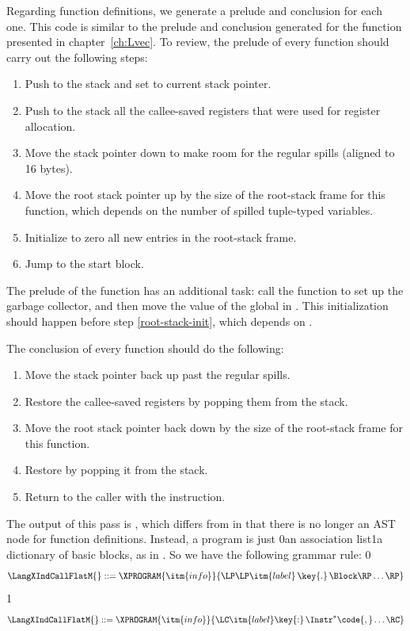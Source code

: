 \documentclass[7x10]{TimesAPriori_MIT}%
\def\racketEd{0}
\def\pythonEd{1}
\providecommand{\BookEdition}{1}
\let\edition\BookEdition
\newcommand{\racket}[1]{{\if\edition\racketEd{#1}\fi}}
\newcommand{\pythonColor}[0]{}
\newcommand{\python}[1]{{\if\edition\pythonEd\pythonColor #1\fi}}
\numberwithin{theorem}{chapter}
\numberwithin{definition}{chapter}
\numberwithin{equation}{chapter}
\begin{document}
Regarding function definitions, we generate a prelude and conclusion
for each one. This code is similar to the prelude and conclusion
generated for the  function presented in
chapter~\ref{ch:Lvec}. To review, the prelude of every function should
carry out the following steps:
\begin{enumerate}
\item Push  to the stack and set  to current stack
  pointer.
\item Push to the stack all the callee-saved registers that were
  used for register allocation.
\item Move the stack pointer  down to make room for the
  regular spills (aligned to 16 bytes).
\item Move the root stack pointer  up by the size of the
  root-stack frame for this function, which depends on the number of
  spilled tuple-typed variables. \label{root-stack-init}
\item Initialize to zero all new entries in the root-stack frame.
\item Jump to the start block.
\end{enumerate}
The prelude of the  function has an additional task: call
the  function to set up the garbage collector, and
then move the value of the global  in
. This initialization should happen before step
\ref{root-stack-init}, which depends on .

The conclusion of every function should do the following:
\begin{enumerate}
\item Move the stack pointer back up past the regular spills.
\item Restore the callee-saved registers by popping them from the
  stack.
\item Move the root stack pointer back down by the size of the
  root-stack frame for this function.
\item Restore  by popping it from the stack.
\item Return to the caller with the  instruction.
\end{enumerate}

The output of this pass is \LangXIndCallFlat{}, which differs from
\LangXIndCall{} in that there is no longer an AST node for function
definitions. Instead, a program is just
\racket{an association list}\python{a dictionary}
of basic blocks, as in \LangXGlobal{}. So we have the following grammar rule:
{\if\edition\racketEd
\[
\LangXIndCallFlatM{} ::= \XPROGRAM{\itm{info}}{\LP\LP\itm{label} \,\key{.}\, \Block \RP\ldots\RP}
\]
\fi}
{\if\edition\pythonEd
\[
\LangXIndCallFlatM{} ::= \XPROGRAM{\itm{info}}{\LC\itm{label}\key{:}\,\Instr^{*}\code{,}\ldots\RC}
\]
\fi}
\end{document}
